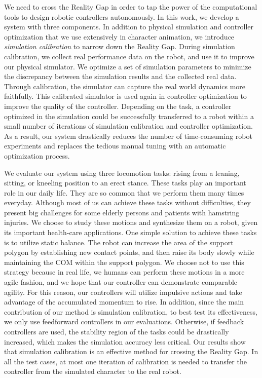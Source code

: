 We need to cross the Reality Gap in order to tap the power of the computational tools to design robotic controllers autonomously. In this work, we develop a system with three components. In addition to physical simulation and controller optimization that we use extensively in character animation, we introduce \emph{simulation calibration} to narrow down the Reality Gap. During simulation calibration, we collect real performance data on the robot, and use it to improve our physical simulator. We optimize a set of simulation parameters to minimize the discrepancy between the simulation results and the collected real data. Through calibration, the simulator can capture the real world dynamics more faithfully. This calibrated simulator is used again in controller optimization to improve the quality of the controller. Depending on the task, a controller optimized in the simulation could be successfully transferred to a robot within a small number of iterations of simulation calibration and controller optimization. As a result, our system drastically reduces the number of time-consuming robot experiments and replaces the tedious manual tuning with an automatic optimization process. 

We evaluate our system using three locomotion tasks: rising from a leaning, sitting, or kneeling position to an erect stance. These tasks play an important role in our daily life. They are so common that we perform them many times everyday. Although most of us can achieve these tasks without difficulties, they present big challenges for some elderly persons and patients with hamstring injuries. We choose to study these motions and synthesize them on a robot, given its important health-care applications. One simple solution to achieve these tasks is to utilize static balance. The robot can increase the area of the support polygon by establishing new contact points, and then raise its body slowly while maintaining the COM within the support polygon. We choose not to use this strategy because in real life, we humans can perform these motions in a more agile fashion, and we hope that our controller can demonstrate comparable agility. For this reason, our controllers will utilize impulsive actions and take advantage of the accumulated momentum to rise. In addition, since the main contribution of our method is simulation calibration, to best test its effectiveness, we only use feedforward controllers in our evaluations. Otherwise, if feedback controllers are used, the stability region of the tasks could be drastically increased, which makes the simulation accuracy less critical. Our results show that simulation calibration is an effective method for crossing the Reality Gap. In all the test cases, at most one iteration of calibration is needed to transfer the controller from the simulated character to the real robot. 

